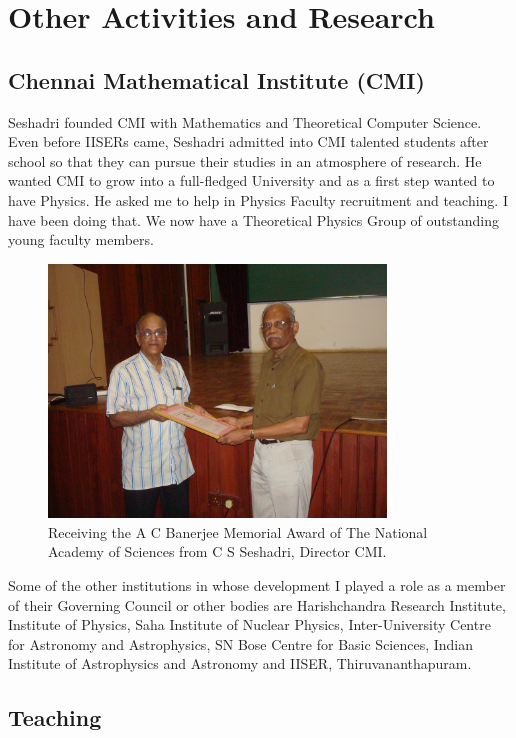 \chapter{Other Activities and Research}

\section*{Chennai Mathematical Institute (CMI)}

Seshadri founded CMI with Mathematics and Theoretical Computer Science. 
Even before IISERs came, Seshadri admitted into CMI talented students 
after school so that they can pursue their studies in an atmosphere of 
research. He wanted CMI to grow into a full-fledged University and as a 
first step wanted to have Physics. He asked me to help in Physics 
Faculty recruitment and teaching. I have been doing that. We now have a 
Theoretical Physics Group of outstanding young faculty members.
\medskip
\begin{figure}[h]
\centering
\includegraphics[width=0.8\textwidth]{images/Rajaji-seshadri.jpg}
\caption{Receiving the A C Banerjee Memorial Award of The
National Academy of Sciences from C S Seshadri, Director CMI.}
\end{figure}

Some of the other institutions in whose development I played a role as a 
member of their Governing Council or other bodies are Harishchandra 
Research Institute, Institute of Physics, Saha Institute of Nuclear 
Physics, Inter-University Centre for Astronomy and Astrophysics, SN Bose 
Centre for Basic Sciences, Indian Institute of Astrophysics and 
Astronomy and IISER, Thiruvananthapuram.

\section*{Teaching}

